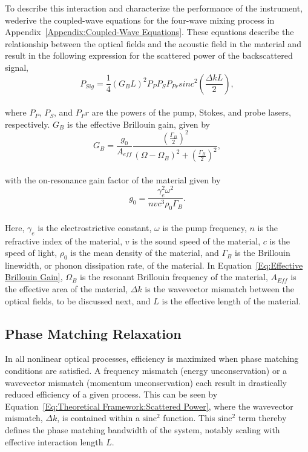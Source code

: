 To describe this interaction and characterize the performance of the instrument, wederive the coupled-wave equations for the four-wave mixing process in Appendix~\ref{Appendix:Coupled-Wave Equations}. These equations describe the relationship between the optical fields and the acoustic field in the material and result in the following expression for the scattered power of the backscattered signal,
\\
\begin{equation}
  P_{Sig} = \frac{1}{4}(G_{B}L)^{2}P_{P}P_{S}P_{Pr}sinc^{2}\left(\frac{\Delta kL}{2}\right),
  \label{Eq:Theoretical Framework:Scattered Power}
\end{equation}
\\
where \(P_P\), \(P_S\), and \(P_Pr\) are the powers of the pump, Stokes, and probe lasers, respectively. \(G_B\) is the effective Brillouin gain, given by
\\
\begin{equation}
  G_{B} = \frac{g_{0}}{A_{eff}}\frac{\left(\frac{\Gamma_{B}}{2}\right)^{2}}{(\Omega - \Omega_{B})^{2} + \left(\frac{\Gamma_{B}}{2}\right)^{2}},
  \label{Eq:Effective Brillouin Gain}
\end{equation}
\\
with the on-resonance gain factor of the material given by
\\
\begin{equation}
  g_{0} = \frac{\gamma_{e}^{2}\omega^{2}}{nvc^{3}\rho_{0}\Gamma_{B}}.
\end{equation}
\\
Here, \(\gamma_e\) is the electrostrictive constant, \(\omega\) is the pump frequency, \(n\) is the refractive index of the material, \(v\) is the sound speed of the material, \(c\) is the speed of light, \(\rho_0\) is the mean density of the material, and \(\Gamma_B\) is the Brillouin linewidth, or phonon dissipation rate, of the material. In Equation~\ref{Eq:Effective Brillouin Gain}, \(\Omega_B\) is the resonant Brillouin frequency of the material, \(A_{Eff}\) is the effective area of the material, \(\Delta k\) is the wavevector mismatch between the optical fields, to be discussed next, and \(L\) is the effective length of the material.


\subsection{Phase Matching Relaxation}
\label{Theoretical Framework: Phase matching relaxation}
In all nonlinear optical processes, efficiency is maximized when phase matching conditions are satisfied. A frequency mismatch (energy unconservation) or a wavevector mismatch (momentum unconservation) each result in drastically reduced efficiency of a given process.\cite{maker1962effects} This can be seen by Equation~\ref{Eq:Theoretical Framework:Scattered Power}, where the wavevector mismatch, \(\Delta k\), is contained within a \(\mathrm{sinc^2}\) function. This \(\mathrm{sinc^2}\) term thereby defines the phase matching bandwidth of the system, notably scaling with effective interaction length \(L\).

